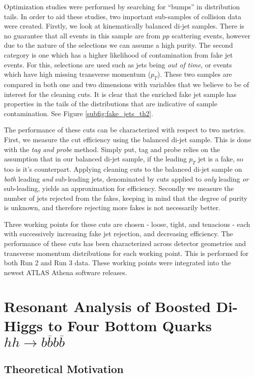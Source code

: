\documentclass[12pt]{article}
\begin{document}
Optimization studies were performed by searching for ``bumps'' in
distribution tails. In order to aid these studies, two important sub-samples of
collision data were created. Firstly, we look at kinematically balanced di-jet
samples. There is no guarantee that all events in this sample are from $pp$
scattering events, however due to the nature of the selections we can assume a
high purity. The second category is one which has a higher likelihood of
contamination from fake jet events. For this, selections are used such as jets
being \textit{out of time}, or events which have high missing transverse
momentum ($p_T$). These two samples are compared in both one and two dimensions with
variables that we believe to be of interest for the cleaning cuts. It is clear
that the enriched fake jet sample has properties in the tails of the
distributions that are indicative of sample contamination. See Figure
\ref{subfig:fake_jets_th2}. 

The performance of these cuts can be characterized with respect to two metrics.
First, we measure the cut efficiency using the balanced di-jet sample. This is
done with the \textit{tag and probe} method. Simply put, tag and probe relies on
the assumption that in our balanced di-jet sample, if the leading $p_T$ jet is a
fake, so too is it's counterpart. Applying cleaning cuts to the balanced di-jet
sample on \textit{both} leading \textit{and} sub-leading jets, denominated by
cuts applied to \textit{only} leading \textit{or} sub-leading, yields an
approximation for efficiency. Secondly we measure the number of jets rejected
from the fakes, keeping in mind that the degree of purity is unknown, and
therefore rejecting more fakes is not necessarily better.  

Three working points for these cuts are chosen - loose, tight, and tenacious -
each with successively increasing fake jet rejection, and decreasing efficiency.
The performance of these cuts has been characterized across detector geometries
and transverse momentum distributions for each working point. This is performed
for both Run 2 and Run 3 data. These working points were integrated into the
newest ATLAS Athena software \cite{atlas_simulation} releases.

\section{Resonant Analysis of Boosted Di-Higgs to Four Bottom Quarks
$hh\rightarrow b\overline{b}b\overline{b}$}
\subsection{Theoretical Motivation}
\end{document}
